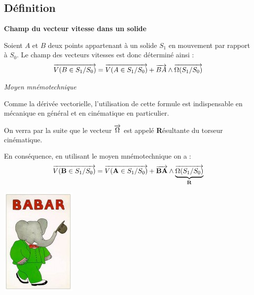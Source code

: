 \documentclass[11pt,oneside]{article}
\begin{document}
\subsection{Définition}
\begin{resultat}
\textbf{Champ du vecteur vitesse dans un solide}

Soient $A$ et $B$ deux points appartenant à un solide $S_1$ en mouvement par rapport à $S_0$. Le champ des vecteurs vitesses est donc déterminé ainsi :
$$
\overrightarrow{V(B\in S_1/S_0)} = \overrightarrow{V(A\in S_1/S_0)} + \overrightarrow{BA}\wedge \overrightarrow{\Omega(S_1/S_0)}
$$
\end{resultat}

\begin{rem}

\textit{Moyen mnémotechnique}

\begin{minipage}[c]{.65\linewidth}
Comme la dérivée vectorielle, l'utilisation de cette formule est indispensable en mécanique en général et en cinématique en particulier.

On verra par la suite que le vecteur $\overrightarrow{\Omega}$ est appelé \textbf{R}ésultante du torseur cinématique. 

En conséquence, en utilisant le moyen mnémotechnique on a :
$$
\overrightarrow{V(\mathbf{B}\in S_1/S_0)} = \overrightarrow{V(\mathbf{A}\in S_1/S_0)} + \overrightarrow{\mathbf{BA}}\wedge \underbrace{\overrightarrow{\Omega(S_1/S_0)}}_{\mathbf{R}}
$$
\end{minipage}
\begin{minipage}[c]{.3\linewidth}
\begin{center}
\includegraphics[width=.6\textwidth]{png/babar}
\end{center}
\end{minipage}
\end{rem}
\end{document}
